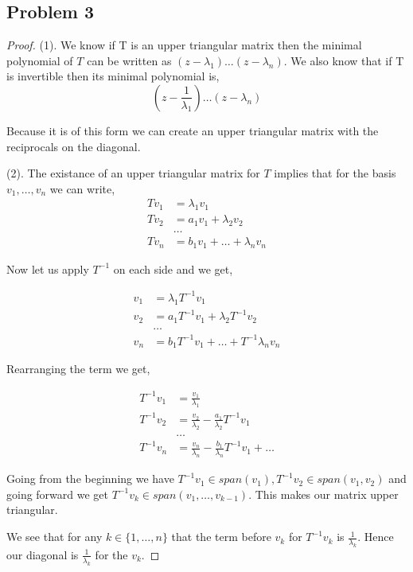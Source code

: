 \documentclass[a4paper]{report}
\begin{document}
\subsection*{Problem 3}
\begin{proof}
   (1).
  We know if T is an upper triangular matrix then the minimal polynomial of $T$ can be written as $(z - \lambda_1)\dots(z - \lambda_n)$. We also know that if T is invertible then  its minimal polynomial is, 
  $$ (z - \frac{1}{\lambda_1}) \dots(z - \lambda_n) $$ 

  Because it is of this form we can create an upper triangular matrix with the reciprocals on the diagonal.

  (2). 
  The existance of an upper triangular matrix for $T$ implies that for the basis $v_1,\dots,v_n$ we can write, 
  \begin{align*}
     Tv_1 &= \lambda_1v_1\\
     Tv_2 &= a_1v_1 + \lambda_2 v_2\\
          &\dots\\
     Tv_n &= b_1v_1 + \dots + \lambda_nv_n
  \end{align*}

  Now let us apply $T^{-1}$ on each side and we get, 

  \begin{align*}
     v_1 &= \lambda_1 T^{-1}v_1\\
     v_2 &= a_1T^{-1}v_1 + \lambda_2 T^{-1}v_2\\
         &\dots\\
     v_n &= b_1T^{-1}v_1 + \dots +T^{-1} \lambda_nv_n
  \end{align*}

  Rearranging the term we get,  

  \begin{align*}
     T^{-1}v_1  &= \frac{v_1}{\lambda_1} \\
     T^{-1}v_2 &= \frac{v_2}{\lambda_2} - \frac{a_1}{\lambda_2}T^{-1}v_1 \\
         &\dots\\
     T^{-1} v_n &=\frac{v_n}{\lambda_n}  - \frac{b_1}{\lambda_n}T^{-1}v_1+ \dots 
  \end{align*}

  Going from the beginning we have $T^{-1}v_1 \in span(v_1), T^{-1}v_2 \in span(v_1,v_2)$ and going forward  we get $T^{-1}v_k \in span(v_1,\dots,v_{k - 1})$. This makes our matrix upper triangular. 

  We see that for any $k \in \{1,\dots,n\}$ that the term before $v_k$ for $T^{-1}v_k$ is $\frac{1}{\lambda_k}$. Hence our diagonal is $\frac{1}{\lambda_k}$ for the $v_k$.

\end{proof}
\end{document}
